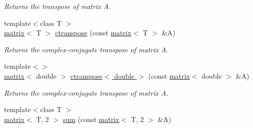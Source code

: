 \begin{DoxyCompactItemize}
\begin{DoxyCompactList}\small\item\em Returns the transpose of matrix A. \end{DoxyCompactList}\item 
\hypertarget{namespacekeycpp_a14503c0419f365433d88fa081d473210}{{\footnotesize template$<$class T $>$ }\\\hyperlink{classkeycpp_1_1matrix}{matrix}$<$ T $>$ \hyperlink{namespacekeycpp_a14503c0419f365433d88fa081d473210}{ctranspose} (const \hyperlink{classkeycpp_1_1matrix}{matrix}$<$ T $>$ \&A)}\label{namespacekeycpp_a14503c0419f365433d88fa081d473210}

\begin{DoxyCompactList}\small\item\em Returns the complex-\/conjugate transpose of matrix A. \end{DoxyCompactList}\item 
\hypertarget{namespacekeycpp_a9fc1e2c9bf6ee79ee28a6f25b7b55b23}{{\footnotesize template$<$$>$ }\\\hyperlink{classkeycpp_1_1matrix}{matrix}$<$ double $>$ \hyperlink{namespacekeycpp_a9fc1e2c9bf6ee79ee28a6f25b7b55b23}{ctranspose$<$ double $>$} (const \hyperlink{classkeycpp_1_1matrix}{matrix}$<$ double $>$ \&A)}\label{namespacekeycpp_a9fc1e2c9bf6ee79ee28a6f25b7b55b23}

\begin{DoxyCompactList}\small\item\em Returns the complex-\/conjugate transpose of matrix A. \end{DoxyCompactList}\item 
\hypertarget{namespacekeycpp_a36cda317c047e8579e665abccf1b1398}{{\footnotesize template$<$class T $>$ }\\\hyperlink{classkeycpp_1_1matrix}{matrix}$<$ T, 2 $>$ \hyperlink{namespacekeycpp_a36cda317c047e8579e665abccf1b1398}{sum} (const \hyperlink{classkeycpp_1_1matrix}{matrix}$<$ T, 2 $>$ \&A)}\label{namespacekeycpp_a36cda317c047e8579e665abccf1b1398}


\end{DoxyCompactItemize}

